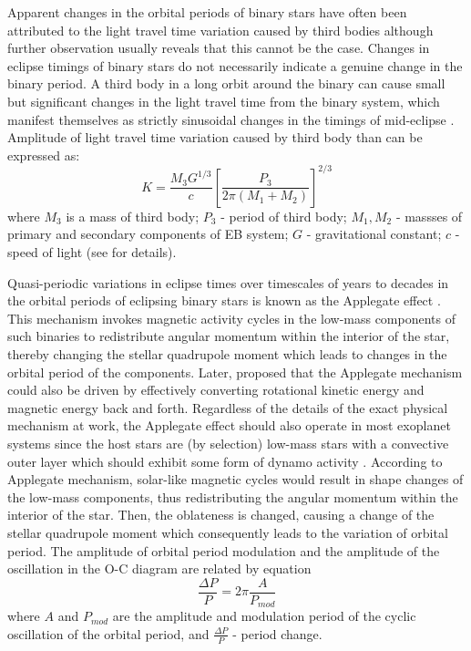 Apparent changes in the orbital periods of binary stars have often been attributed to the light travel time variation caused by third
bodies although further observation usually reveals that this cannot be the case.
Changes in eclipse timings of binary stars do not necessarily
indicate a genuine change in the binary period. 
A third body in a long orbit around the binary can cause small but significant changes in the
light travel time from the binary system, which manifest themselves
as strictly sinusoidal changes in the timings of mid-eclipse \cite{Brinkworth2006}.
Amplitude of light travel time variation caused by third
body than can be expressed as:
\begin{equation}
K = \frac{M_3 G^{1/3}}{c} \left[\frac{P_3}{2\pi(M_1+M_2)} \right]^{2/3}
\end{equation}
where $M_3$ is a mass of third body; $P_3$ - period of third body; $M_1, M_2$ - massses of primary and secondary components of EB system;  $G$ - gravitational constant; $c$ - speed of light (see \cite{Pribula2012} for details).

Quasi-periodic variations in eclipse times over timescales of years to decades in the orbital periods of 
eclipsing binary stars is known as the Applegate effect \cite{Applegate1992}. 
This mechanism invokes magnetic activity cycles in the low-mass components of such
binaries to redistribute angular momentum within the interior of the star, thereby changing the stellar quadrupole moment which leads to changes in the orbital period of the components. Later, \cite{Lanza1998} proposed
that the Applegate mechanism could also be driven by effectively converting rotational kinetic energy and magnetic
energy back and forth. Regardless of the details of the exact physical mechanism at work, the Applegate effect should
also operate in most exoplanet systems since the host stars are (by selection) low-mass stars with a convective outer
layer which should exhibit some form of dynamo activity \cite{Watson2010}.
According to Applegate mechanism, solar-like magnetic cycles would result in shape
changes of the low-mass components, thus redistributing the angular momentum within
the interior of the star. Then, the oblateness is changed, causing a change of the stellar
quadrupole moment which consequently leads to the variation of orbital period. 
The amplitude of orbital period modulation and the amplitude of
the oscillation in the O-C diagram are related by equation
\begin{equation}
\frac{\Delta P}{P} =2\pi \frac{A}{P_{mod}}
\end{equation}
where $A$ and $P_{mod}$ are the amplitude and modulation period of the cyclic oscillation
of the orbital period, and $\frac{\Delta P}{P}$ - period change.

